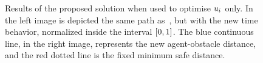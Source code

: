 \begin{figure}[!t]
\begin{center}
\begin{minipage}{.45\linewidth}
		\end{minipage}
	\end{center}
	\caption{Results of the proposed solution when used to optimise $u_i$ only.
    In the left image is depicted the same path as~, but with the new time behavior,
    normalized inside the interval $\left[ 0,1 \right]$. The blue continuous line, in the right image, represents
    the new agent-obstacle distance, and the red dotted line is the fixed minimum safe distance.}%
    \label{FIG:ST-BEZIER-2D-U-RESULT}
\end{figure}
\begin{figure}[!t]
	\begin{center}
		\begin{minipage}{.45\linewidth}
			\centering
		\end{minipage}
		\begin{minipage}{.45\linewidth}
			\centering

\end{minipage}
\end{center}
\end{figure}
